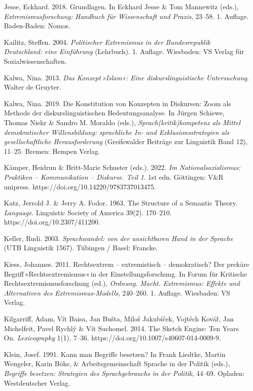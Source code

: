 Jesse, Eckhard. 2018. Grundlagen. In Eckhard Jesse \& Tom Mannewitz (eds.), \emph{Extremismusforschung: Handbuch für Wissenschaft und Praxis}, 23--58. 1. Auflage. Baden-Baden: Nomos.

Kailitz, Steffen. 2004. \emph{Politischer Extremismus in der Bundesrepublik Deutschland: eine Einführung} (Lehrbuch). 1. Auflage. Wiesbaden: VS Verlag für Sozialwissenschaften.

Kalwa, Nina. 2013. \emph{Das Konzept\,»Islam«: Eine diskurslinguistische Untersuchung}. Walter de Gruyter.

Kalwa, Nina. 2019. Die Konstitution von Konzepten in Diskursen: Zoom als Methode der diskurslinguistischen Bedeutungsanalyse. In Jürgen Schiewe, Thomas Niehr \& Sandro M. Moraldo (eds.), \emph{Sprach(kritik)kompetenz als Mittel demokratischer Willensbildung: sprachliche In- und Exklusionsstrategien als gesellschaftliche Herausforderung} (Greifswalder Beiträge zur Linguistik Band 12), 11--25. Bremen: Hempen Verlag.

Kämper, Heidrun \& Britt-Marie Schuster (eds.). 2022. \emph{Im Nationalsozialismus: Praktiken -- Kommunikation -- Diskurse. Teil 1}. 1st edn. Göttingen: V\&R unipress. https://doi.org/10.14220/9783737013475.

Katz, Jerrold J. \& Jerry A. Fodor. 1963. The Structure of a Semantic Theory. \emph{Language}. Linguistic Society of America 39(2). 170--210. https://doi.org/10.2307/411200.

Keller, Rudi. 2003. \emph{Sprachwandel: von der unsichtbaren Hand in der Sprache} (UTB Linguistik 1567). Tübingen / Basel: Francke.

Kiess, Johannes. 2011. Rechtsextrem -- extremistisch -- demokratisch? Der prekäre Begriff\,»Rechtsextremismus«\,in der Einstellungsforschung. In Forum für Kritische Rechtsextremismusforschung (ed.), \emph{Ordnung. Macht. Extremismus: Effekte und Alternativen des Extremismus-Modells}, 240--260. 1. Auflage. Wiesbaden: VS Verlag.

Kilgarriff, Adam, Vít Baisa, Jan Bušta, Miloš Jakubíček, Vojtěch Kovář, Jan Michelfeit, Pavel Rychlý \& Vít Suchomel. 2014. The Sketch Engine: Ten Years On. \emph{Lexicography} 1(1). 7--36. https://doi.org/10.1007/s40607-014-0009-9.

Klein, Josef. 1991. Kann man Begriffe besetzen? In Frank Liedtke, Martin Wengeler, Karin Böke, \& Arbeitsgemeinschaft Sprache in der Politik (eds.), \emph{Begriffe besetzen: Strategien des Sprachgebrauchs in der Politik}, 44--69. Opladen: Westdeutscher Verlag.

